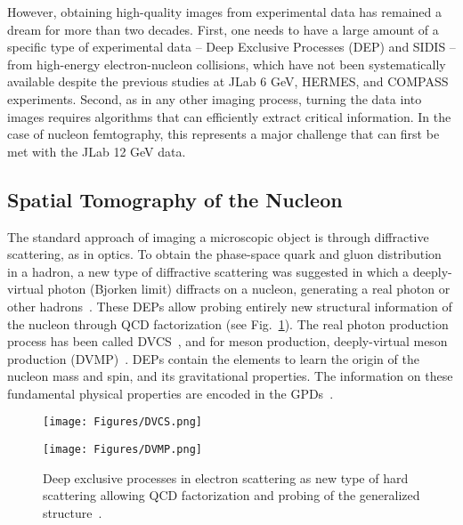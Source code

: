 However, obtaining high-quality images from experimental data has remained a dream for more than two decades.  First, one needs to have a large amount of a specific type of experimental data -- Deep Exclusive Processes (DEP) and SIDIS -- from high-energy electron-nucleon collisions, which have not been systematically available despite the previous studies at JLab 6 GeV, HERMES, and COMPASS experiments. Second, as in any other imaging process, turning the data into images requires algorithms that can efficiently extract critical information. 
In the case of nucleon femtography, this represents a major challenge that can first be met with the JLab 12 GeV data. 

\subsection{Spatial Tomography of the Nucleon} 

The standard approach of imaging a microscopic object is through diffractive scattering, as in optics. To obtain the phase-space quark and gluon distribution in a hadron, a new type of diffractive scattering was suggested in which a deeply-virtual photon (Bjorken limit) diffracts on a nucleon, generating a real photon or other hadrons~\cite{Ji:1996ek}. These DEPs allow probing entirely new structural information of the nucleon through QCD factorization (see Fig.~\ref{fig:dep}). The real photon production process has been called %
DVCS~\cite{Ji:1996nm}, and for meson production, deeply-virtual meson production (DVMP)~\cite{Radyushkin:1996ru}.
DEPs contain the elements to learn the origin
of the nucleon mass and spin, and its gravitational properties. The information on these fundamental physical properties are encoded in the
GPDs~\cite{mueller1994wave,Ji:1996ek}.

\begin{figure}[htb]
\centering
\begin{minipage}{0.45\textwidth}
\centering
\texttt{[image: Figures/DVCS.png]}
\end{minipage}
\begin{minipage}{0.45\textwidth}
\centering
\texttt{[image: Figures/DVMP.png]}
\end{minipage}
    \caption{Deep exclusive processes in electron scattering as new type of hard scattering allowing QCD factorization and probing of the generalized structure~\cite{Ji:1996ek}.}
    \label{fig:dep}
\end{figure}

